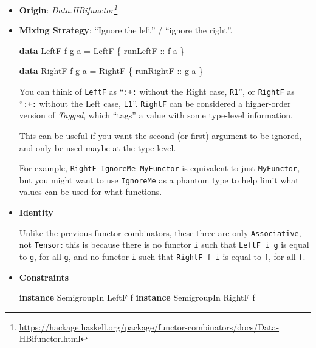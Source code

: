 \documentclass[]{article}
\newenvironment{Shaded}{}{}
\newcommand{\DataTypeTok}[1]{\textcolor[rgb]{0.56,0.13,0.00}{#1}}
\newcommand{\KeywordTok}[1]{\textcolor[rgb]{0.00,0.44,0.13}{\textbf{#1}}}
\newcommand{\NormalTok}[1]{#1}
\newcommand{\OtherTok}[1]{\textcolor[rgb]{0.00,0.44,0.13}{#1}}
\renewcommand{\href}[2]{#2\footnote{\url{#1}}}
\begin{document}
\begin{itemize}
\item
  \textbf{Origin}:
  \emph{\href{https://hackage.haskell.org/package/functor-combinators/docs/Data-HBifunctor.html}{Data.HBifunctor}}
\item
  \textbf{Mixing Strategy}: ``Ignore the left'' / ``ignore the right''.

\begin{Shaded}
\begin{Highlighting}[]
\KeywordTok{data} \DataTypeTok{LeftF}\NormalTok{  f g a }\OtherTok{=} \DataTypeTok{LeftF}\NormalTok{  \{}\OtherTok{ runLeftF  ::}\NormalTok{ f a \}}

\KeywordTok{data} \DataTypeTok{RightF}\NormalTok{ f g a }\OtherTok{=} \DataTypeTok{RightF}\NormalTok{ \{}\OtherTok{ runRightF ::}\NormalTok{ g a \}}
\end{Highlighting}
\end{Shaded}

  You can think of \texttt{LeftF} as ``\texttt{:+:} without the Right case,
  \texttt{R1}'', or \texttt{RightF} as ``\texttt{:+:} without the Left case,
  \texttt{L1}''. \texttt{RightF} can be considered a higher-order version of
  \emph{Tagged}, which ``tags'' a value with some type-level information.

  This can be useful if you want the second (or first) argument to be ignored,
  and only be used maybe at the type level.

  For example, \texttt{RightF\ IgnoreMe\ MyFunctor} is equivalent to just
  \texttt{MyFunctor}, but you might want to use \texttt{IgnoreMe} as a phantom
  type to help limit what values can be used for what functions.
\item
  \textbf{Identity}

  Unlike the previous functor combinators, these three are only
  \texttt{Associative}, not \texttt{Tensor}: this is because there is no functor
  \texttt{i} such that \texttt{LeftF\ i\ g} is equal to \texttt{g}, for all
  \texttt{g}, and no functor \texttt{i} such that \texttt{RightF\ f\ i} is equal
  to \texttt{f}, for all \texttt{f}.
\item
  \textbf{Constraints}

\begin{Shaded}
\begin{Highlighting}[]
\KeywordTok{instance} \DataTypeTok{SemigroupIn} \DataTypeTok{LeftF}\NormalTok{  f}
\KeywordTok{instance} \DataTypeTok{SemigroupIn} \DataTypeTok{RightF}\NormalTok{ f}
\end{Highlighting}
\end{Shaded}


\end{itemize}
\end{document}
